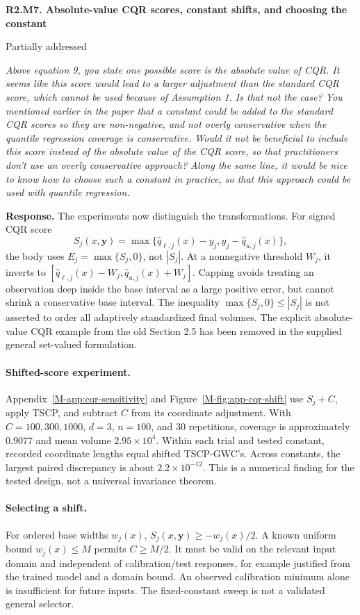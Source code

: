 \documentclass[11pt]{article}
\newcommand{\msapp}[1]{Appendix~\ref*{M-#1}}
\newcommand{\msfig}[1]{Figure~\ref*{M-#1}}
\newcommand{\point}[3]{\par\Needspace{7\baselineskip}\medskip
\noindent\parbox[t]{0.77\linewidth}{\textbf{#1}}\hfill
\parbox[t]{0.21\linewidth}{\raggedleft\small\sffamily #2}\par\nopagebreak
{\color{ReviewerBlue}\small\itshape #3\par}\textbf{Response.} }
\begin{document}
\point{R2.M7. Absolute-value CQR scores, constant shifts, and choosing the constant}{Partially addressed}{Above equation 9, you state one possible score is the absolute value
of CQR. It seems like this score would lead to a larger adjustment
than the standard CQR score, which cannot be used because of
Assumption 1. Is that not the case? You mentioned earlier in the
paper that a constant could be added to the standard CQR scores so
they are non-negative, and not overly conservative when the
quantile regression coverage is conservative. Would it not be
beneficial to include this score instead of the absolute value of
the CQR score, so that practitioners don't use an overly
conservative approach? Along the same line, it would be nice to
know how to choose such a constant in practice, so that this
approach could be used with quantile regression.}
\label{response:R2.M7}
The experiments now distinguish the transformations. For signed CQR score
\[
 S_j(x,\boldsymbol y)=\max\{\widehat q_{\ell,j}(x)-y_j,
 y_j-\widehat q_{u,j}(x)\},
\]
the body uses $E_j=\max\{S_j,0\}$, not $|S_j|$. At a nonnegative threshold $W_j$, it inverts to
$[\widehat q_{\ell,j}(x)-W_j,\widehat q_{u,j}(x)+W_j]$.
Capping avoids treating an observation deep inside the base interval as a large positive error, but cannot shrink a conservative base interval. The inequality $\max\{S_j,0\}\leq|S_j|$ is not asserted to order all adaptively standardized final volumes. The explicit absolute-value CQR example from the old Section 2.5 has been removed in the supplied general set-valued formulation.

\paragraph{Shifted-score experiment.}
\msapp{app:cqr-sensitivity} and \msfig{fig:app-cqr-shift} use $S_j+C$, apply TSCP, and subtract $C$ from its coordinate adjustment. With $C=100,300,1000$, $d=3$, $n=100$, and 30 repetitions, coverage is approximately $0.9077$ and mean volume $2.95\times10^4$. Within each trial and tested constant, recorded coordinate lengths equal shifted TSCP-GWC's. Across constants, the largest paired discrepancy is about $2.2\times10^{-12}$. This is a numerical finding for the tested design, not a universal invariance theorem.

\paragraph{Selecting a shift.}
For ordered base widths $w_j(x)$, $S_j(x,\boldsymbol y)\geq-w_j(x)/2$. A known uniform bound $w_j(x)\leq M$ permits $C\geq M/2$. It must be valid on the relevant input domain and independent of calibration/test responses, for example justified from the trained model and a domain bound. An observed calibration minimum alone is insufficient for future inputs. The fixed-constant sweep is not a validated general selector.
\end{document}
